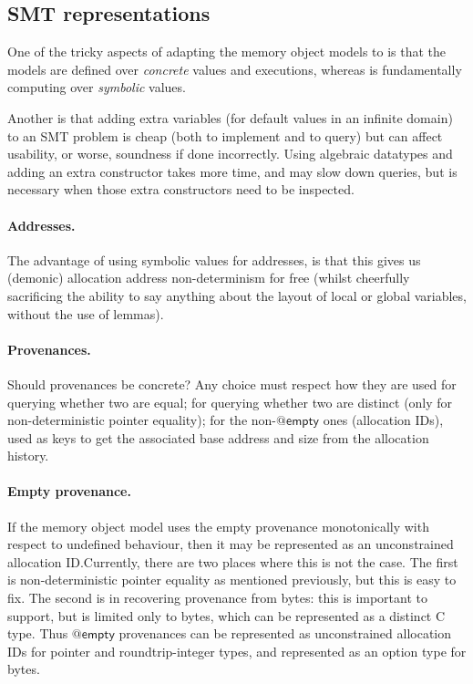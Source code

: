 \subsection{SMT representations}\label{subsec:smt-rep}

One of the tricky aspects of adapting the memory object models to  is
that the models are defined over \emph{concrete} values and executions, whereas
 is fundamentally computing over \emph{symbolic} values.

Another is that adding extra variables (for default values in an infinite
domain) to an SMT problem is cheap (both to implement and to query) but can
affect usability, or worse, soundness if done incorrectly. Using algebraic
datatypes and adding an extra constructor takes more time, and may slow down
queries, but is necessary when those extra constructors need to be inspected.

\paragraph{Addresses.}%
The advantage of using symbolic values for addresses, is that this gives us
(demonic) allocation address non-determinism for free (whilst cheerfully
sacrificing the ability to say anything about the layout of local or global
variables, without the use of lemmas).

\paragraph{Provenances.}%
Should provenances be concrete? Any choice must respect how they are used  \textemdash{}
for querying whether two are equal; for querying whether two are distinct (only
for non-deterministic pointer equality); for the non-$@\mathsf{empty}$ ones
(allocation IDs), used as keys to get the associated base address and size from
the allocation history.

\paragraph{Empty provenance.}%
If the memory object model uses the empty provenance monotonically with respect
to undefined behaviour, then it may be represented as an unconstrained
allocation ID.\@ Currently, there are two places where this is not the case.
The first is non-deterministic pointer equality as mentioned previously, but
this is easy to fix. The second is in recovering provenance from bytes: this
is important to support, but is limited only to bytes, which can be represented
as a distinct C type. Thus $@\mathsf{empty}$ provenances can be represented
as unconstrained allocation IDs for pointer and roundtrip-integer types,
and represented as an option type for bytes.

